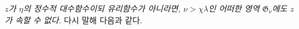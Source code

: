 
\emph{$z$가 $\eta$의 정수적 대수함수이되 유리함수가 아니라면, $\nu>\chi\lambda$인 어떠한 영역 $\mathfrak G_\nu$에도 $z$가 속할 수 없다.} 다시 말해 다음과 같다.
